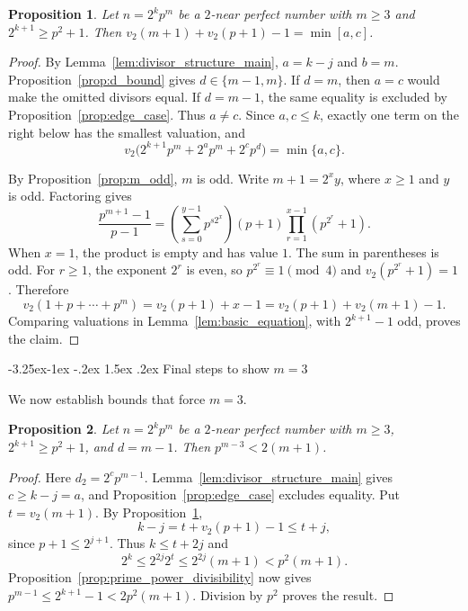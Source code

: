 \documentclass[10pt]{article}
\makeatletter
\renewcommand\subsection{\@startsection{subsection}{2}{\z@}
{-3.25ex\@plus -1ex \@minus -.2ex}
{1.5ex \@plus .2ex}
{\normalfont\normalsize\bfseries\boldmath}}
\newtheorem{proposition}{Proposition}
\theoremstyle{definition}
\makeatother
\begin{document}
\begin{proposition}\label{prop:2adic_equation}
Let $n=2^kp^m$ be a $2$-near perfect number with $m\geq 3$ and $2^{k+1}\geq p^2+1$. Then $v_2(m+1)+v_2(p+1)-1=\min[a,c]$.
\end{proposition}

\begin{proof}
By Lemma~\ref{lem:divisor_structure_main}, $a=k-j$ and $b=m$.
Proposition~\ref{prop:d_bound} gives $d\in\{m-1,m\}$.
If $d=m$, then $a=c$ would make the omitted divisors equal.
If $d=m-1$, the same equality is excluded by
Proposition~\ref{prop:edge_case}. Thus $a\ne c$. Since $a,c\le k$,
exactly one term on the right below has the smallest valuation, and
\[
v_2\bigl(2^{k+1}p^m+2^ap^m+2^cp^d\bigr)=\min\{a,c\}.
\]

By Proposition~\ref{prop:m_odd}, $m$ is odd. Write $m+1=2^xy$,
where $x\ge1$ and $y$ is odd. Factoring gives
\[
\frac{p^{m+1}-1}{p-1}
=\left(\sum_{s=0}^{y-1}p^{s2^x}\right)
 (p+1)\prod_{r=1}^{x-1}(p^{2^r}+1).
\]
When $x=1$, the product is empty and has value $1$.
The sum in parentheses is odd. For $r\ge1$, the exponent $2^r$
is even, so $p^{2^r}\equiv1\pmod4$ and $v_2(p^{2^r}+1)=1$.
Therefore
\[
v_2(1+p+\cdots+p^m)
=v_2(p+1)+x-1=v_2(p+1)+v_2(m+1)-1.
\]
Comparing valuations in Lemma~\ref{lem:basic_equation}, with
$2^{k+1}-1$ odd, proves the claim.
\end{proof}

\subsection{Final steps to show $m=3$}
\label{sec:final-contradiction}

We now establish bounds that force $m=3$.

\begin{proposition}\label{prop:bound_d_m_minus_1}
Let $n=2^kp^m$ be a $2$-near perfect number with $m\geq 3$, $2^{k+1}\geq p^2+1$, and $d=m-1$. Then $p^{m-3} < 2(m+1)$.
\end{proposition}

\begin{proof}
Here $d_2=2^cp^{m-1}$. Lemma~\ref{lem:divisor_structure_main}
gives $c\ge k-j=a$, and Proposition~\ref{prop:edge_case} excludes
equality. Put $t=v_2(m+1)$. By Proposition~\ref{prop:2adic_equation},
\[
k-j=t+v_2(p+1)-1\le t+j,
\]
since $p+1\le2^{j+1}$. Thus $k\le t+2j$ and
\[
2^k\le2^{2j}2^t\le2^{2j}(m+1)<p^2(m+1).
\]
Proposition~\ref{prop:prime_power_divisibility} now gives
$p^{m-1}\le2^{k+1}-1<2p^2(m+1)$. Division by $p^2$ proves the result.
\end{proof}
\end{document}
